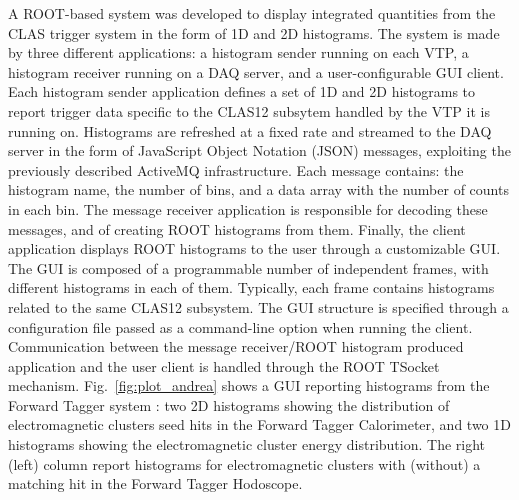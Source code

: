 
A ROOT-based system was developed to display integrated quantities from the CLAS trigger system in the form of 1D and 2D histograms. The system is made by three different applications: a histogram sender running on each VTP, a histogram receiver running on a DAQ server, and a user-configurable GUI client.
Each histogram sender application defines a set of 1D and 2D histograms to report trigger data specific to the CLAS12 subsytem handled by the VTP it is running on. Histograms are refreshed at a fixed rate and streamed to the DAQ server in the form of JavaScript Object Notation (JSON) messages, exploiting the previously described ActiveMQ infrastructure. Each message contains: the histogram name, the number of bins, and a data array with the number of counts in each bin.
The message receiver application is responsible for decoding these messages, and of creating ROOT histograms from them. Finally, the client application displays ROOT histograms to the user through a customizable GUI. The GUI is composed of a programmable number of independent frames, with different histograms in each of them. Typically, each frame contains histograms related to the same CLAS12 subsystem. The GUI structure is specified through a configuration file passed as a command-line option when running the client. Communication between the message receiver/ROOT histogram produced application and the user client is handled through the ROOT TSocket mechanism.
Fig.~\ref{fig:plot_andrea} shows a GUI reporting histograms from the Forward Tagger system \cite{ft-ref}: two 2D histograms showing the distribution of electromagnetic clusters seed hits in the Forward Tagger Calorimeter, and two 1D histograms showing the electromagnetic cluster energy distribution. The right (left) column report histograms for electromagnetic clusters  with (without) a matching hit in the Forward Tagger Hodoscope.

